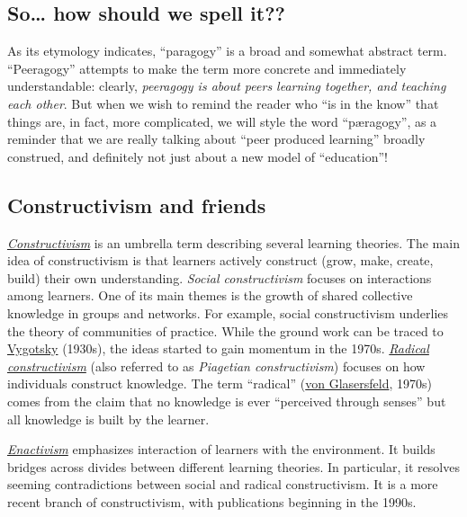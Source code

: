 \subsection{So\ldots{} how should we spell it??\textbf{}}

As its etymology indicates, ``paragogy'' is a broad and somewhat
abstract term. ``Peeragogy'' attempts to make the term more concrete and
immediately understandable: clearly, \emph{peeragogy is about peers
learning together, and teaching each other}. But when we wish to remind
the reader who ``is in the know'' that things are, in fact, more
complicated, we will style the word ``pæragogy'', as a reminder that we
are really talking about ``peer produced learning'' broadly construed,
and definitely not just about a new model of ``education''!

\subsection{Constructivism and friends}

\href{http://en.wikipedia.org/wiki/Constructivism\_\%28learning\_theory\%29}{\emph{Constructivism}}
is an umbrella term describing several learning theories. The main idea
of constructivism is that learners actively construct (grow, make,
create, build) their own understanding. \emph{Social constructivism}
focuses on interactions among learners. One of its main themes is the
growth of shared collective knowledge in groups and networks. For
example, social constructivism underlies the theory of communities of
practice. While the ground work can be traced to
\href{http://en.wikipedia.org/wiki/Vygotsky}{Vygotsky} (1930s), the
ideas started to gain momentum in the 1970s.
\emph{\href{http://en.wikipedia.org/wiki/Radical\_constructivism\#Constructivist\_trends}{Radical
constructivism}} (also referred to as \emph{Piagetian constructivism})
focuses on how individuals construct knowledge. The term ``radical''
(\href{http://en.wikipedia.org/wiki/Ernst\_von\_Glasersfeld}{von
Glasersfeld}, 1970s) comes from the claim that no knowledge is ever
``perceived through senses'' but all knowledge is built by the learner.

\href{http://en.wikipedia.org/wiki/Enactivism}{\emph{Enactivism}}
emphasizes interaction of learners with the environment. It builds
bridges across divides between different learning theories. In
particular, it resolves seeming contradictions between social and
radical constructivism. It is a more recent branch of constructivism,
with publications beginning in the 1990s.

